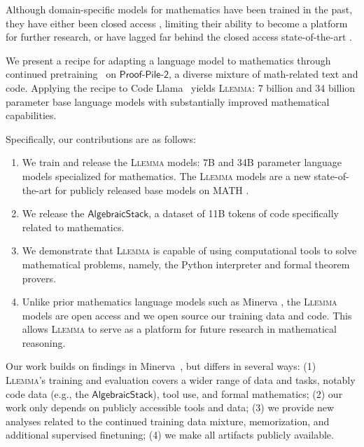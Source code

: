 Although domain-specific models for mathematics have been trained in the past, they have either been closed access \citep{lewkowycz2022solving}, limiting their ability to become a platform for further research, or have lagged far behind the closed access state-of-the-art \citep{azerbayev2023ProofNet}. 

We present a recipe for adapting a language model to mathematics through continued pretraining~\citep{lewkowycz2022solving,roziere2023code} on $\mathsf{Proof}$-$\mathsf{Pile}$-$\mathsf{2}$, a diverse mixture of math-related text and code. Applying the recipe to Code Llama~\citep{roziere2023code} yields \textsc{Llemma}: 7 billion and 34 billion parameter base language models with substantially improved mathematical capabilities.

Specifically, our contributions are as follows:

\begin{enumerate}[leftmargin=*]
    \item We train and release the \textsc{Llemma} models: 7B and 34B parameter language models specialized for mathematics. The \textsc{Llemma} models are a new state-of-the-art for publicly released base models on MATH \citep{lewkowycz2022solving}.
    \item We release the $\mathsf{AlgebraicStack}$, a dataset of 11B tokens of code specifically related to mathematics.

    \item We demonstrate that \textsc{Llemma} is capable of using computational tools to solve mathematical problems, namely, the Python interpreter and formal theorem provers.
    \item Unlike prior mathematics language models such as Minerva \citep{lewkowycz2022solving}, the \textsc{Llemma} models are open access and we open source our training data and code. This allows \textsc{Llemma} to serve as a platform for future research in mathematical reasoning.
\end{enumerate}

Our work builds on findings in Minerva~\citep{lewkowycz2022solving}, but differs in several  ways: (1) \textsc{Llemma}'s training and evaluation covers a wider range of data and tasks, notably code data (e.g., the $\mathsf{AlgebraicStack}$), tool use, and formal mathematics; (2) our work only depends on publicly accessible tools and data; (3) we provide new analyses related to the continued training data mixture, memorization, and additional supervised finetuning; (4) we make all artifacts publicly available.

